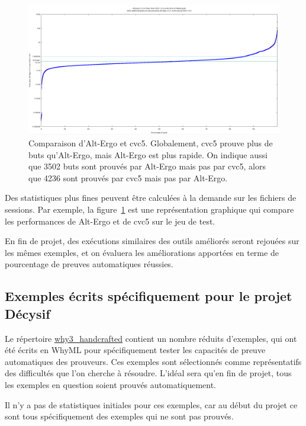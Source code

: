 \documentclass[a4paper,11pt]{article}
\begin{document}
\begin{figure}
  \centering
  \hspace*{-0.1\textwidth}\includegraphics[width=1.2\textwidth]{AE-vs-CVC5.png}
  \caption{Comparaison d'Alt-Ergo et cvc5. Globalement, cvc5 prouve
    plus de buts qu'Alt-Ergo, mais Alt-Ergo est plus rapide. On
    indique aussi que 3502 buts sont prouvés par Alt-Ergo mais pas par
    cvc5, alors que 4236 sont prouvés par cvc5 mais pas par Alt-Ergo.}
  \label{fig:AEvsCVC5}
  \hrulefill
\end{figure}

Des statistiques plus fines peuvent être calculées à la demande sur
les fichiers de sessions. Par exemple, la figure~\ref{fig:AEvsCVC5}
est une représentation graphique qui compare les performances de Alt-Ergo
et de cvc5 sur le jeu de test.

En fin de projet, des exécutions similaires des outils améliorés seront
rejouées sur les mêmes exemples, et on évaluera les améliorations
apportées en terme de pourcentage de preuves automatiques réussies.

\subsection{Exemples écrits spécifiquement pour le projet Décysif}

Le répertoire \url{why3_handcrafted} contient un nombre réduits
d'exemples, qui ont été écrits en WhyML pour spécifiquement tester les
capacités de preuve automatiques des prouveurs. Ces exemples sont
sélectionnés comme représentatifs des difficultés que l'on cherche à
résoudre. L'idéal sera qu'en fin de projet, tous les exemples en
question soient prouvés automatiquement.

Il n'y a pas de statistiques initiales pour ces exemples, car au début
du projet ce sont tous spécifiquement des exemples qui ne sont pas
prouvés.
\end{document}
